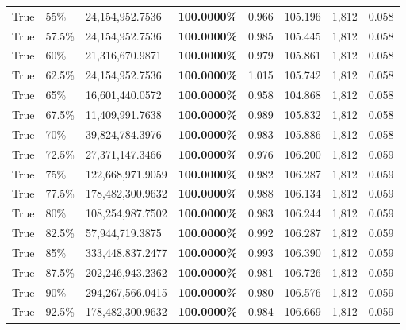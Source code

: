 \begin{table}[H]
\begin{tabular}{lllrllll}
\cline{1-8} \cline{2-8}
True & 55\% & 24,154,952.7536 & \bfseries \color{red} 100.0000\% & 0.966 & 105.196 & 1,812 & 0.058 \\
\cline{1-8} \cline{2-8}
True & 57.5\% & 24,154,952.7536 & \bfseries \color{red} 100.0000\% & 0.985 & 105.445 & 1,812 & 0.058 \\
\cline{1-8} \cline{2-8}
True & 60\% & 21,316,670.9871 & \bfseries \color{red} 100.0000\% & 0.979 & 105.861 & 1,812 & 0.058 \\
\cline{1-8} \cline{2-8}
True & 62.5\% & 24,154,952.7536 & \bfseries \color{red} 100.0000\% & 1.015 & 105.742 & 1,812 & 0.058 \\
\cline{1-8} \cline{2-8}
True & 65\% & 16,601,440.0572 & \bfseries \color{red} 100.0000\% & 0.958 & 104.868 & 1,812 & 0.058 \\
\cline{1-8} \cline{2-8}
True & 67.5\% & 11,409,991.7638 & \bfseries \color{red} 100.0000\% & 0.989 & 105.832 & 1,812 & 0.058 \\
\cline{1-8} \cline{2-8}
True & 70\% & 39,824,784.3976 & \bfseries \color{red} 100.0000\% & 0.983 & 105.886 & 1,812 & 0.058 \\
\cline{1-8} \cline{2-8}
True & 72.5\% & 27,371,147.3466 & \bfseries \color{red} 100.0000\% & 0.976 & 106.200 & 1,812 & 0.059 \\
\cline{1-8} \cline{2-8}
True & 75\% & 122,668,971.9059 & \bfseries \color{red} 100.0000\% & 0.982 & 106.287 & 1,812 & 0.059 \\
\cline{1-8} \cline{2-8}
True & 77.5\% & 178,482,300.9632 & \bfseries \color{red} 100.0000\% & 0.988 & 106.134 & 1,812 & 0.059 \\
\cline{1-8} \cline{2-8}
True & 80\% & 108,254,987.7502 & \bfseries \color{red} 100.0000\% & 0.983 & 106.244 & 1,812 & 0.059 \\
\cline{1-8} \cline{2-8}
True & 82.5\% & 57,944,719.3875 & \bfseries \color{red} 100.0000\% & 0.992 & 106.287 & 1,812 & 0.059 \\
\cline{1-8} \cline{2-8}
True & 85\% & 333,448,837.2477 & \bfseries \color{red} 100.0000\% & 0.993 & 106.390 & 1,812 & 0.059 \\
\cline{1-8} \cline{2-8}
True & 87.5\% & 202,246,943.2362 & \bfseries \color{red} 100.0000\% & 0.981 & 106.726 & 1,812 & 0.059 \\
\cline{1-8} \cline{2-8}
True & 90\% & 294,267,566.0415 & \bfseries \color{red} 100.0000\% & 0.980 & 106.576 & 1,812 & 0.059 \\
\cline{1-8} \cline{2-8}
True & 92.5\% & 178,482,300.9632 & \bfseries \color{red} 100.0000\% & 0.984 & 106.669 & 1,812 & 0.059 \\

\end{tabular}
\end{table}
